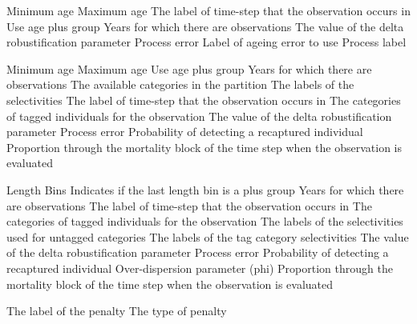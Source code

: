  {Minimum age}
 {Maximum age}
 {The label of time-step that the observation occurs in}
 {Use age plus group}
 {Years for which there are observations}
 {The value of the delta robustification parameter}
 {Process error}
 {Label of ageing error to use}
 {Process label}
\par\textbf{}\par
{} {Minimum age}
 {Maximum age}
 {Use age plus group}
 {Years for which there are observations}
 {The available categories in the partition}
 {The labels of the selectivities}
 {The label of time-step that the observation occurs in}
 {The categories of tagged individuals for the observation}
 {The value of the delta robustification parameter}
 {Process error}
 {Probability of detecting a recaptured individual}
 {Proportion through the mortality block of the time step when the observation is evaluated}
\par\textbf{}\par
{} {Length Bins}
 {Indicates if the last length bin is a plus group}
 {Years for which there are observations}
 {The label of time-step that the observation occurs in}
 {The categories of tagged individuals for the observation}
 {The labels of the selectivities used for untagged categories}
 {The labels of the tag category selectivities}
 {The value of the delta robustification parameter}
 {Process error}
 {Probability of detecting a recaptured individual}
 {Over-dispersion parameter (phi)}
 {Proportion through the mortality block of the time step when the observation is evaluated}
\par\par
{} {The label of the penalty}
 {The type of penalty}
\par\textbf{}\par
